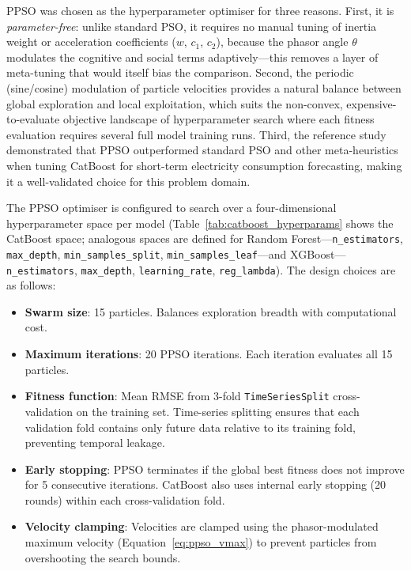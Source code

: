 PPSO \parencite{ghasemi2019ppso} was chosen as the hyperparameter optimiser for three reasons. First, it is \emph{parameter-free}: unlike standard PSO, it requires no manual tuning of inertia weight or acceleration coefficients ($w$, $c_1$, $c_2$), because the phasor angle $\theta$ modulates the cognitive and social terms adaptively---this removes a layer of meta-tuning that would itself bias the comparison. Second, the periodic (sine/cosine) modulation of particle velocities provides a natural balance between global exploration and local exploitation, which suits the non-convex, expensive-to-evaluate objective landscape of hyperparameter search where each fitness evaluation requires several full model training runs. Third, the reference study \parencite{zhang2023catboostppso} demonstrated that PPSO outperformed standard PSO and other meta-heuristics when tuning CatBoost for short-term electricity consumption forecasting, making it a well-validated choice for this problem domain.

The PPSO optimiser is configured to search over a four-dimensional hyperparameter space per model (Table~\ref{tab:catboost_hyperparams} shows the CatBoost space; analogous spaces are defined for Random Forest---\texttt{n\_estimators}, \texttt{max\_depth}, \texttt{min\_samples\_split}, \texttt{min\_samples\_leaf}---and XGBoost---\texttt{n\_estimators}, \texttt{max\_depth}, \texttt{learning\_rate}, \texttt{reg\_lambda}). The design choices are as follows:

\begin{itemize}
    \item \textbf{Swarm size}: 15 particles. Balances exploration breadth with computational cost.
    \item \textbf{Maximum iterations}: 20 PPSO iterations. Each iteration evaluates all 15 particles.
    \item \textbf{Fitness function}: Mean RMSE from 3-fold \texttt{TimeSeriesSplit} cross-validation on the training set. Time-series splitting ensures that each validation fold contains only future data relative to its training fold, preventing temporal leakage.
    \item \textbf{Early stopping}: PPSO terminates if the global best fitness does not improve for 5 consecutive iterations. CatBoost also uses internal early stopping (20 rounds) within each cross-validation fold.
    \item \textbf{Velocity clamping}: Velocities are clamped using the phasor-modulated maximum velocity (Equation~\ref{eq:ppso_vmax}) to prevent particles from overshooting the search bounds.
\end{itemize}

